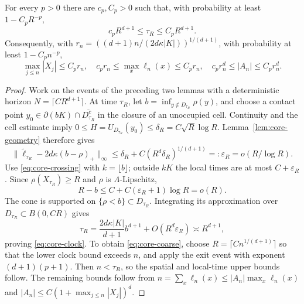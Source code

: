 \begin{proposition}\label{prop:core-coarse}
For every $p>0$ there are $c_p,C_p>0$ such that, with probability at least
$1-C_pR^{-p}$,
\begin{equation}\label{eq:core-clock}
 c_pR^{d+1}\leq\tau_R\leq C_pR^{d+1}.
\end{equation}
Consequently, with $r_n=((d+1)n/(2d\kappa|K|))^{1/(d+1)}$, with probability
at least $1-C_p n^{-p}$,
\begin{equation}\label{eq:core-coarse}
 \max_{j\leq n}|X_j|\leq C_pr_n,\quad
 c_pr_n\leq\max_x\ell_n(x)\leq C_pr_n,\quad
 c_pr_n^d\leq|A_n|\leq C_pr_n^d.
\end{equation}
\end{proposition}
\begin{proof}
Work on the events of the preceding two lemmas with a deterministic
horizon $N=\lceil CR^{d+1}\rceil$. At time $\tau_R$, let
$b=\inf_{y\notin D_{\tau_R}}\rho(y)$, and choose a contact point
$y_0\in\partial(bK)\cap\overline{D_{\tau_R}^c}$ in the closure of an
unoccupied cell. Continuity and the cell estimate imply
$0\leq H=U_{D_{\tau_R}}(y_0)\leq\delta_R=C\sqrt R\log R$.
Lemma~\ref{lem:core-geometry} therefore gives
\[
 \|\widetilde\ell_{\tau_R}-2d\kappa(b-\rho)_+\|_\infty
 \leq\delta_R+C(R^d\delta_R)^{1/(d+1)}
 =:\varepsilon_R=o(R/\log R).
\]
Use \eqref{eq:core-crossing} with $k=\lfloor b\rfloor$; outside $kK$ the
local times are at most $C+\varepsilon_R$. Since
$\rho(X_{\tau_R})\geq R$ and $\rho$ is $\Lambda$-Lipschitz,
\[
 R-b\leq C+C(\varepsilon_R+1)\log R=o(R).
\]
The cone is supported on $\{\rho<b\}\subset D_{\tau_R}$.
Integrating its approximation over $D_{\tau_R}\subset B(0,CR)$ gives
\[
 \tau_R=\frac{2d\kappa|K|}{d+1}b^{d+1}
 +O(R^d\varepsilon_R)\asymp R^{d+1},
\]
proving \eqref{eq:core-clock}. To obtain \eqref{eq:core-coarse}, choose
$R=\lceil C n^{1/(d+1)}\rceil$ so that the lower clock bound exceeds $n$,
and apply the exit event with exponent $(d+1)(p+1)$. Then $n<\tau_R$,
so the spatial and local-time upper bounds follow. The remaining bounds
follow from $n=\sum_x\ell_n(x)\leq|A_n|\max_x\ell_n(x)$ and
$|A_n|\leq C(1+\max_{j\leq n}|X_j|)^d$.
\end{proof}
